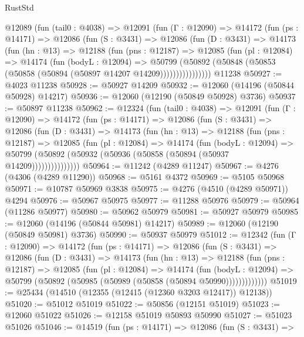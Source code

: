 \begin{lexlean}{RustStd}
\begin{coremodule}
    @12089
      (fun (tail0 : @4038) =>
      @12091
        (fun (Γ : @12090) =>
        @14172
          (fun (ps : @14171) =>
          @12086
            (fun (S : @3431) =>
            @12086
              (fun (D : @3431) =>
              @14173
                (fun (hn : @13) =>
                @12188
                  (fun (pns : @12187) =>
                  @12085
                    (fun (pl : @12084) =>
                    @14174
                      (fun (bodyL : @12094) =>
                      @50799
                        (@50892
                          (@50848 (@50853 (@50858 (@50894 (@50897 @14207 @14209))))))))))))))))
    @11238
@50927 := @4023 @11238
@50928 := @50927 @14209
@50932 := @12060 (@14196 (@50844 @50928) @14217)
@50936 := @12060 (@12190 (@50849 @50928) @3736)
@50937 := @50897 @11238
@50962 := @12324
    (fun (tail0 : @4038) =>
    @12091
      (fun (Γ : @12090) =>
      @14172
        (fun (ps : @14171) =>
        @12086
          (fun (S : @3431) =>
          @12086
            (fun (D : @3431) =>
            @14173
              (fun (hn : @13) =>
              @12188
                (fun (pns : @12187) =>
                @12085
                  (fun (pl : @12084) =>
                  @14174
                    (fun (bodyL : @12094) =>
                    @50799 (@50892 (@50932 (@50936 (@50858 (@50894 (@50937 @14209)))))))))))))))
@50964 := @11242 (@4289 @11247)
@50967 := @4276 (@4306 (@4289 @11290))
@50968 := @5161 @4372
@50969 := @5105 @50968
@50971 := @10787 @50969 @3838
@50975 := @4276 (@4510 (@4289 @50971)) @4294
@50976 := @50967 @50975
@50977 := @11288 @50976
@50979 := @50964 (@11286 @50977)
@50980 := @50962 @50979
@50981 := @50927 @50979
@50985 := @12060 (@14196 (@50844 @50981) @14217)
@50989 := @12060 (@12190 (@50849 @50981) @3736)
@50990 := @50937 @50979
@51012 := @12342
    (fun (Γ : @12090) =>
    @14172
      (fun (ps : @14171) =>
      @12086
        (fun (S : @3431) =>
        @12086
          (fun (D : @3431) =>
          @14173
            (fun (hn : @13) =>
            @12188
              (fun (pns : @12187) =>
              @12085
                (fun (pl : @12084) =>
                @14174
                  (fun (bodyL : @12094) =>
                  @50799 (@50892 (@50985 (@50989 (@50858 (@50894 @50990)))))))))))))
@51019 := @25434 (@14510 (@12355 (@12415 (@12360 @3203 @12417)) @12138))
@51020 := @51012 @51019
@51022 := @50856 (@12151 @51019)
@51023 := @12060 @51022
@51026 := @12158 @51019 @50893 @50990
@51027 := @51023 @51026
@51046 := @14519
    (fun (ps : @14171) =>
    @12086
      (fun (S : @3431) =>

\end{coremodule}
\end{lexlean}
